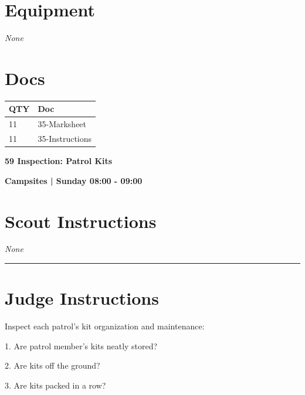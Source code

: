 \documentclass[10pt]{article}
\newcommand{\newtitle}[1]{\begin{center}{\Huge\bfseries #1 }\\ \vspace{5mm}\end{center}}
\newcommand{\newsubtitle}[1]{\begin{center}{\color{grey}\Large\bfseries #1 }\\ \vspace{5mm}\end{center}}
\begin{document}
	\begin{multicols}{2}

		\section*{\faWrench \: Equipment}

				\textit{None}
		
		\vfill\null
		\columnbreak

			\section*{\faFile \: Docs}
		 	\begin{center}
			\begin{tabular}{p{2cm}p{4cm}}

			\textbf{QTY} & \textbf{Doc} \\\toprule
										11&35-Marksheet\\\midrule
										11&35-Instructions\\\midrule
							\end{tabular}
			\end{center}
	

		\vfill\null

		\end{multicols}



	\vspace{1cm}


	\clearpage
		\newtitle{59 Inspection: Patrol Kits }
	\newsubtitle{Campsites | Sunday 08:00 - 09:00}
		\setcounter{section}{58}
	\section*{Scout Instructions}
		\textit{None}
	
	\vspace{0.5cm}
	\hrule
	\vspace{0.5cm}

		\section*{Judge Instructions}
		Inspect each patrol's kit organization and maintenance:



1. Are patrol member's kits neatly stored? 

2. Are kits off the ground?

3. Are kits packed in a row?
\end{document}
